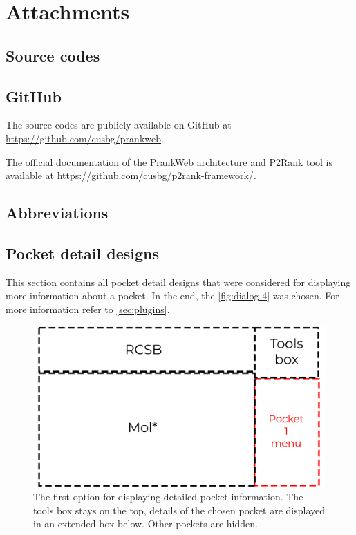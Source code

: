 \chapter{Attachments}

\section{Source codes}
\label{sec:source_codes}

\section{GitHub}
\label{sec:github}

The source codes are publicly available on GitHub at \url{https://github.com/cusbg/prankweb}.

The official documentation of the PrankWeb architecture and P2Rank tool is available at \url{https://github.com/cusbg/p2rank-framework/}.

\section{Abbreviations}
\label{sec:abbreviations}


\section{Pocket detail designs}
\label{sec:pocket_detail_designs}

This section contains all pocket detail designs that were considered for displaying more information about a pocket. In the end, the \cref{fig:dialog-4} was chosen. For more information refer to \cref{sec:plugins}.

\begin{figure}[htb]
    \centering
    \includegraphics[width=\linewidth]{img/dialog_1-svg.pdf}
    \caption{The first option for displaying detailed pocket information. The tools box stays on the top, details of the chosen pocket are displayed in an extended box below. Other pockets are hidden.}
    \label{fig:dialog-1}
\end{figure}

